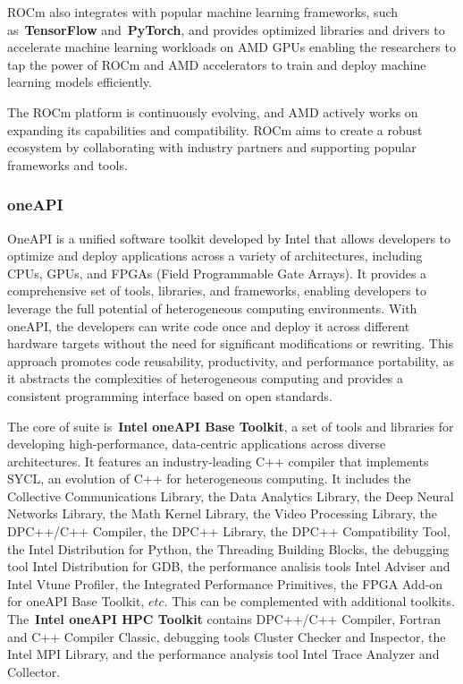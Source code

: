 \par
ROCm also integrates with popular machine learning frameworks, such as~\textbf{TensorFlow} and~\textbf{PyTorch}, and provides optimized libraries and drivers to accelerate machine learning workloads on AMD GPUs enabling the researchers to tap the power of ROCm and AMD accelerators to train and deploy machine learning models efficiently.


\par
The ROCm platform is continuously evolving, and AMD actively works on expanding its capabilities and compatibility. ROCm aims to create a robust ecosystem by collaborating with industry partners and supporting popular frameworks and tools. 


\subsubsection{oneAPI}


\par
OneAPI is a unified software toolkit developed by Intel that allows developers to optimize and deploy applications across a variety of architectures, including CPUs, GPUs, and FPGAs (Field Programmable Gate Arrays).
It provides a comprehensive set of tools, libraries, and frameworks, enabling developers to leverage the full potential of heterogeneous computing environments.
With oneAPI, the developers can write code once and deploy it across different hardware targets without the need for significant modifications or rewriting.
This approach promotes code reusability, productivity, and performance portability, as it abstracts the complexities of heterogeneous computing and provides a consistent programming interface based on open standards.


\par
The core of suite is~\textbf{Intel oneAPI Base Toolkit}, a set of tools and libraries for developing high-performance, data-centric applications across diverse architectures.
It features an industry-leading C++ compiler that implements SYCL, an evolution of C++ for heterogeneous computing.
It includes the Collective Communications Library, the Data Analytics Library, the Deep Neural Networks Library, the Math Kernel Library, the Video Processing Library, the DPC++/C++ Compiler, the DPC++ Library, the DPC++ Compatibility Tool, the Intel Distribution for Python, the Threading Building Blocks, the debugging tool Intel Distribution for GDB, the performance analisis tools Intel Adviser and Intel Vtune Profiler, the Integrated Performance Primitives, the FPGA Add-on for oneAPI Base Toolkit, $etc$.
This can be complemented with additional toolkits.
The~\textbf{Intel oneAPI HPC Toolkit} contains DPC++/C++ Compiler, Fortran and C++ Compiler Classic, debugging tools Cluster Checker and Inspector, the Intel MPI Library, and the performance analysis tool Intel Trace Analyzer and Collector.


